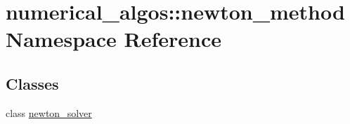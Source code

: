 \hypertarget{namespacenumerical__algos_1_1newton__method}{\section{numerical\-\_\-algos\-:\-:newton\-\_\-method Namespace Reference}
\label{namespacenumerical__algos_1_1newton__method}
}
\subsection*{Classes}
\begin{DoxyCompactItemize}
\item 
class \hyperlink{classnumerical__algos_1_1newton__method_1_1newton__solver}{newton\-\_\-solver}
\end{DoxyCompactItemize}
